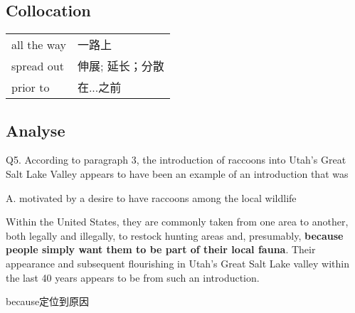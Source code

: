 \subsection{Collocation}

\begin{tabular}{ll}
    all the way & 一路上       \\
    spread out  & 伸展; 延长；分散 \\
    prior to    & 在...之前    \\
\end{tabular}

\subsection{Analyse}

\begin{blk}
    \begin{qst}
        Q5. According to paragraph 3, the introduction of raccoons into Utah’s Great Salt Lake Valley appears to have been an example of an introduction that was
    \end{qst}

    \begin{chc}
        A. motivated by a desire to have raccoons among the local wildlife
    \end{chc}

    \begin{psgq}
        Within the United States, they are commonly taken from one area to another, both legally and illegally, to restock hunting areas and, presumably, \textbf{because people simply want them to be part of their local fauna}. Their appearance and subsequent flourishing in Utah’s Great Salt Lake valley within the last 40 years appears to be from such an introduction.
    \end{psgq}

    \begin{nlz}
        because定位到原因
    \end{nlz}
\end{blk}

